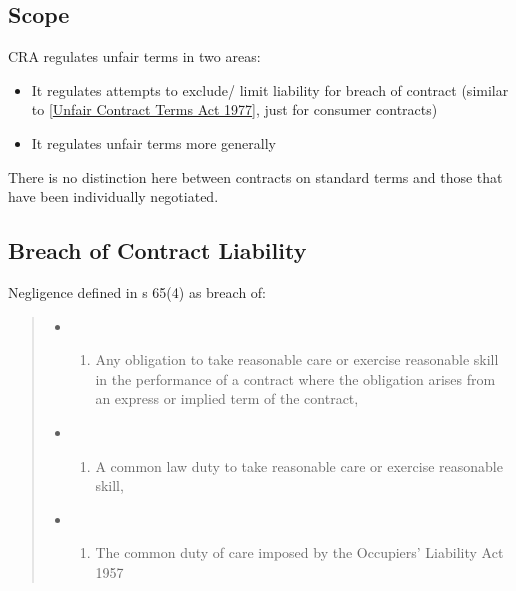\documentclass[
]{article}
\providecommand{\tightlist}{%
  \setlength{\itemsep}{0pt}\setlength{\parskip}{0pt}}
\begin{document}
\hypertarget{scope-1}{%
\subsection{Scope}\label{scope-1}}

CRA regulates unfair terms in two areas:

\begin{itemize}
\tightlist
\item
  It regulates attempts to exclude/ limit liability for breach of
  contract (similar to
  {[}\protect\hyperlink{unfair-contract-terms-act-1977}{Unfair Contract
  Terms Act 1977}{]}, just for consumer contracts)
\item
  It regulates unfair terms more generally
\end{itemize}

There is no distinction here between contracts on standard terms and
those that have been individually negotiated.

\hypertarget{breach-of-contract-liability}{%
\subsection{Breach of Contract
Liability}\label{breach-of-contract-liability}}

Negligence defined in s 65(4) as breach of:

\begin{quote}
\begin{itemize}
\item
  \begin{enumerate}
  \def\labelenumi{(\alph{enumi})}
  \tightlist
  \item
    Any obligation to take reasonable care or exercise reasonable skill
    in the performance of a contract where the obligation arises from an
    express or implied term of the contract,
  \end{enumerate}
\item
  \begin{enumerate}
  \def\labelenumi{(\alph{enumi})}
  \setcounter{enumi}{1}
  \tightlist
  \item
    A common law duty to take reasonable care or exercise reasonable
    skill,
  \end{enumerate}
\item
  \begin{enumerate}
  \def\labelenumi{(\alph{enumi})}
  \setcounter{enumi}{2}
  \tightlist
  \item
    The common duty of care imposed by the Occupiers' Liability Act 1957
  \end{enumerate}
\end{itemize}
\end{quote}
\end{document}
